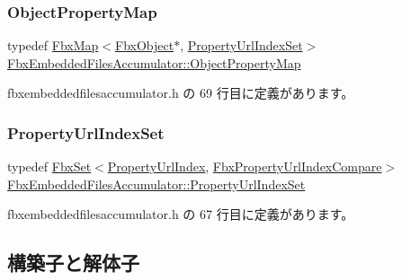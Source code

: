 \subsubsection{\texorpdfstring{Object\+Property\+Map}{ObjectPropertyMap}}
{\footnotesize\ttfamily typedef \hyperlink{class_fbx_map}{Fbx\+Map}$<$\hyperlink{class_fbx_object}{Fbx\+Object}$\ast$, \hyperlink{class_fbx_embedded_files_accumulator_a007ad10c417fc8b5373ab6358f5fb5be}{Property\+Url\+Index\+Set}$>$ \hyperlink{class_fbx_embedded_files_accumulator_abc919e5ba3486530790dcd7ef90b8eed}{Fbx\+Embedded\+Files\+Accumulator\+::\+Object\+Property\+Map}}



 fbxembeddedfilesaccumulator.\+h の 69 行目に定義があります。

\mbox{\label{class_fbx_embedded_files_accumulator_a007ad10c417fc8b5373ab6358f5fb5be}} 
\subsubsection{\texorpdfstring{Property\+Url\+Index\+Set}{PropertyUrlIndexSet}}
{\footnotesize\ttfamily typedef \hyperlink{class_fbx_set}{Fbx\+Set}$<$\hyperlink{struct_fbx_embedded_files_accumulator_1_1_property_url_index}{Property\+Url\+Index}, \hyperlink{struct_fbx_embedded_files_accumulator_1_1_fbx_property_url_index_compare}{Fbx\+Property\+Url\+Index\+Compare}$>$ \hyperlink{class_fbx_embedded_files_accumulator_a007ad10c417fc8b5373ab6358f5fb5be}{Fbx\+Embedded\+Files\+Accumulator\+::\+Property\+Url\+Index\+Set}}



 fbxembeddedfilesaccumulator.\+h の 67 行目に定義があります。



\subsection{構築子と解体子}
\mbox{\label{class_fbx_embedded_files_accumulator_a22c32a739a59987e432fabe5f46c460e}} 
